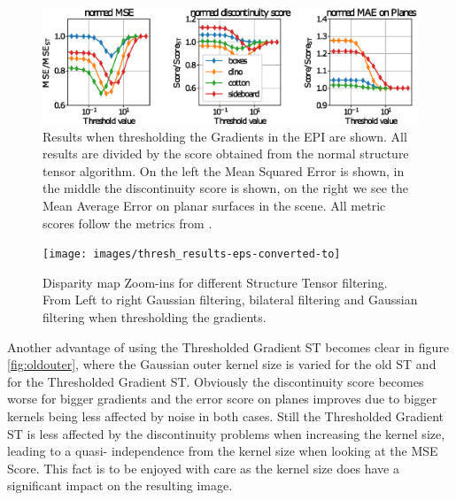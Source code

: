 \documentclass  [
  paper    = a4,
  BCOR     = 10mm,
  twoside,
  fontsize = 12pt,
  fleqn,
  toc      = bibnumbered,
  toc      = listofnumbered,
  numbers  = noendperiod,
  headings = normal,
  listof   = leveldown,
  version  = 3.03
]                                       {scrreprt}
\begin{document}
\begin{figure}
	\centering
	\includegraphics[width=1\linewidth]{images/thresh_params}
	\caption[Results when thresholding the Gradients in the EPI]{Results when thresholding the Gradients in the EPI are shown. All results are divided by the score obtained from the normal structure tensor algorithm. On the left the Mean Squared Error is shown, in the middle the discontinuity score is shown, on the right we see the Mean Average Error on planar surfaces in the scene. All metric scores follow the metrics from \cite{honauer2016benchmark}. }
	\label{fig:threshparams}
\end{figure}
\begin{figure}
	\centering
	\texttt{[image: images/thresh\_results-eps-converted-to]}
	\caption[Disparity map Zoom-ins for different methods]{Disparity map Zoom-ins for different Structure Tensor filtering. From Left to right Gaussian filtering, bilateral filtering and Gaussian filtering when thresholding the gradients.}
	\label{fig:threshresults}
\end{figure}

Another advantage of using the Thresholded Gradient ST becomes clear in figure \ref{fig:oldouter}, where the Gaussian outer kernel size is varied for the old ST and for the Thresholded Gradient ST. Obviously the discontinuity score becomes worse for bigger gradients and the error score on planes improves due to bigger kernels being less affected by noise in both cases. Still the Thresholded Gradient ST is less affected by the discontinuity problems when increasing the kernel size, leading to a quasi- independence from the kernel size when looking at the MSE Score. This fact is to be enjoyed with care as the kernel size does have a significant impact on the resulting image.
\end{document}
